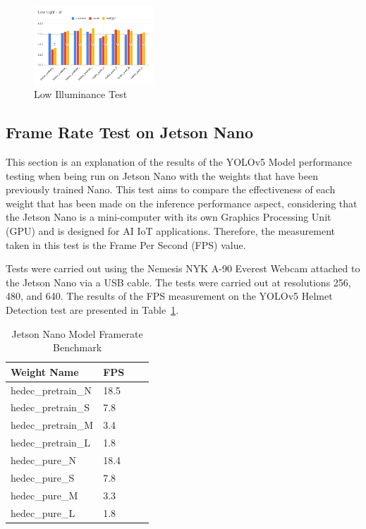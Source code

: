 \begin{figure}[ht]
  \centering
  \includegraphics[width=0.4\textwidth]{gambar/utilities/lowlight_test.png}
  \caption{Low Illuminance Test}
  \label{fig:lowillum_test}  
\end{figure}

\subsection{Frame Rate Test on Jetson Nano}
\label{subsec:model_jetsonnano_test}

\par This section is an explanation of the results of the YOLOv5 Model performance testing when being run on Jetson Nano with the weights that have been previously trained Nano. This test aims to compare the effectiveness of each weight that has been made on the inference performance aspect, considering that the Jetson Nano is a mini-computer with its own Graphics Processing Unit (GPU) and is designed for AI IoT applications. Therefore, the measurement taken in this test is the Frame Per Second (FPS) value.

 
\par Tests were carried out using the Nemesis NYK A-90 Everest Webcam attached to the Jetson Nano via a USB cable. The tests were carried out at resolutions 256, 480, and 640. The results of the FPS measurement on the YOLOv5 Helmet Detection test are presented in Table~\ref{tb:jetsonano_model_benchmark}.

\begin{table}
  \centering
  \caption{Jetson Nano Model Framerate Benchmark}
  \label{tb:jetsonano_model_benchmark}
  \begin{tabular}{|l|l|l|l|} 
    \hline
    \textbf{Weight Name} & \textbf{FPS}      \\ 
    \hline
    hedec\_pretrain\_N                             & 18.5          \\
    hedec\_pretrain\_S                             & 7.8           \\
    hedec\_pretrain\_M                           & 3.4           \\
    hedec\_pretrain\_L                            & 1.8           \\
    hedec\_pure\_N                              & 18.4          \\
    hedec\_pure\_S                              & 7.8           \\
    hedec\_pure\_M                              & 3.3           \\
    hedec\_pure\_L                                 & 1.8           \\
    \hline
  \end{tabular}
\end{table}


